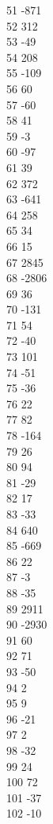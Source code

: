 { 51	-871 \\
 52	312 \\
 53	-49 \\
 54	208 \\
 55	-109 \\
 56	60 \\
 57	-60 \\
 58	41 \\
 59	-3 \\
 60	-97 \\
 61	39 \\
 62	372 \\
 63	-641 \\
 64	258 \\
 65	34 \\
 66	15 \\
 67	2845 \\
 68	-2806 \\
 69	36 \\
 70	-131 \\
 71	54 \\
 72	-40 \\
 73	101 \\
 74	-51 \\
 75	-36 \\
 76	22 \\
 77	82 \\
 78	-164 \\
 79	26 \\
 80	94 \\
 81	-29 \\
 82	17 \\
 83	-33 \\
 84	640 \\
 85	-669 \\
 86	22 \\
 87	-3 \\
 88	-35 \\
 89	2911 \\
 90	-2930 \\
 91	60 \\
 92	71 \\
 93	-50 \\
 94	2 \\
 95	9 \\
 96	-21 \\
 97	2 \\
 98	-32 \\
 99	24 \\
 100	72 \\
 101	-37 \\
 102	-10 \\
}
